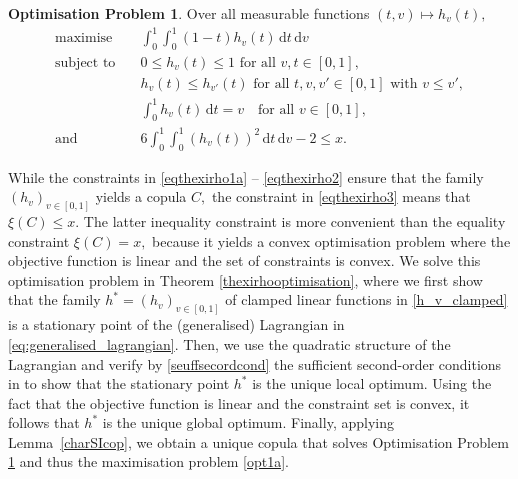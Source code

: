 \documentclass{article}
\theoremstyle{plain}
\theoremstyle{definition}
\newtheorem{optimisationproblem}{Optimisation Problem}
\newcommand{\de}{\mathrm{\,d}}
\begin{document}
\begin{optimisationproblem}\label{optprob}
Over all measurable functions \((t,v)\mapsto h_v(t),\)
\begin{align}
    \text{maximise} \quad &\int_0^1\int_0^1 (1-t) h_v(t) \de t \de v \nonumber\\
    \label{eqthexirho1a} \text{subject to} \quad  &0\le h_v(t) \le 1 \text{ for all } v,t\in [0,1],\\
    \label{eqthexirho1b}  \quad  &h_v(t) \le h_{v'}(t)  \text{ for all } t,v,v'\in [0,1] \text{ with } v\le v',\\
    \label{eqthexirho2} \quad  &\int_0^1 h_v(t) \de t = v \quad \text{for all } v\in [0,1],\\
    \label{eqthexirho3} \text{and} \quad & 6 \int_0^1\int_0^1 (h_v(t))^2 \de t \de v - 2 \le x. 
\end{align}
\end{optimisationproblem}
While the constraints in \eqref{eqthexirho1a} -- \eqref{eqthexirho2} ensure that the family \((h_v)_{v\in [0,1]}\) yields a copula \(C,\) the constraint in \eqref{eqthexirho3} means that \(\xi(C) \le x.\) 
The latter inequality constraint is more convenient than the equality constraint $\xi(C)=x,$ because it yields a convex optimisation problem where the objective function is linear and the set of constraints is convex.
We solve this optimisation problem in Theorem \ref{thexirhooptimisation}, where we first show that the family \(h^* = (h_v)_{v\in [0,1]}\) of clamped linear functions in \eqref{h_v_clamped} is a stationary point of the (generalised) Lagrangian in \eqref{eq:generalised_lagrangian}.
Then, we use the quadratic structure of the Lagrangian and verify by \eqref{seuffsecordcond} the sufficient second-order conditions in \cite[Thm.~3.63]{bonnans2013perturbation} to show that the stationary point \(h^*\) is the unique local optimum.
Using the fact that the objective function is linear and the constraint set is convex, it follows that \(h^*\) is the unique global optimum.
Finally, applying Lemma~\ref{charSIcop}, we obtain a unique copula that solves Optimisation Problem \ref{optprob} and thus the maximisation problem \eqref{opt1a}.
\end{document}
